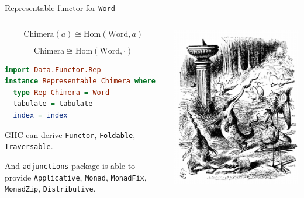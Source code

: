 \documentclass[handout]{beamer}
\begin{document}
\begin{frame}[fragile]{Representable functor for {\tt Word}}

\begin{columns}[T]
  \begin{column}{.6\textwidth}

$$
\mathrm{Chimera}(a) \cong \mathrm{Hom}(\mathrm{Word}, a)
$$

$$
\mathrm{Chimera} \cong \mathrm{Hom}(\mathrm{Word}, \cdot)
$$

\begin{lstlisting}[language=Haskell]
import Data.Functor.Rep
instance Representable Chimera where
  type Rep Chimera = Word
  tabulate = tabulate
  index = index
\end{lstlisting}

GHC can derive
{\tt Functor},
{\tt Foldable},
{\tt Traversable}.

And {\tt adjunctions} package is able to provide
{\tt Applicative},
{\tt Monad},
{\tt MonadFix},
{\tt MonadZip},
{\tt Distributive}.

\end{column}

\begin{column}{.4\textwidth}
  \includegraphics[width=1.2\textwidth]{zoo.png}
\end{column}

\end{columns}

\end{frame}
\end{document}
